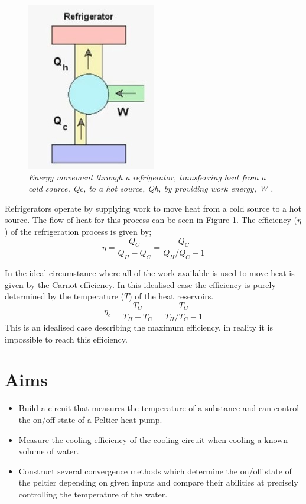 \documentclass[10pt]{article}
\begin{document}
\begin{figure}[h!]
    \centering
    \includegraphics[scale=.75]{ref.jpg}
    \caption{\it{Energy movement through a refrigerator, transferring heat from a cold source, Qc, to a hot source, Qh, by providing work energy, W \cite{fridge}.}}
    \label{fig:fridge}
\end{figure}

Refrigerators operate by supplying work to move heat from a cold source to a hot source. The flow of heat for this process can be seen in Figure \ref{fig:fridge}. The efficiency ($\eta$) of the refrigeration process is given by;
\begin{equation}
    \eta = \frac{Q_C}{Q_H-Q_C}=\frac{Q_C}{Q_H/Q_C - 1}
\end{equation}

In the ideal circumstance where all of the work available is used to move heat is given by the Carnot efficiency\cite{carnot}. In this idealised case the efficiency is purely determined by the temperature ($T$) of the heat reservoirs.
\begin{equation}
        \eta_c = \frac{T_C}{T_H-T_C}=\frac{T_C}{T_H/T_C - 1}
\end{equation}
This is an idealised case describing the maximum efficiency, in reality it is impossible to reach this efficiency. 




\section*{Aims}
\begin{itemize}
    \item Build a circuit that measures the temperature of a substance and can control the on/off state of a Peltier heat pump\cite{peltier}. 
    \item Measure the cooling efficiency of the cooling circuit when cooling a known volume of water.
    \item Construct several convergence methods which determine the on/off state of the peltier depending on given inputs and compare their abilities at precisely controlling the temperature of the water.
\end{itemize}
\end{document}
